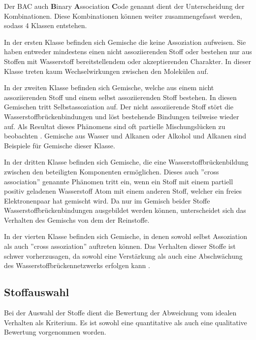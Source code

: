 \documentclass[../thesis.tex]{subfiles}
\begin{document}
Der BAC auch \textbf{B}inary \textbf{A}ssociation \textbf{C}ode genannt dient der Unterscheidung der Kombinationen. Diese Kombinationen können weiter zusammengefasst werden, sodass 4 Klassen entstehen.

In der ersten Klasse befinden sich Gemische die keine Assoziation aufweisen. Sie haben entweder mindestens einen nicht assoziierenden Stoff oder bestehen nur aus Stoffen mit Wasserstoff bereitstellendem oder akzeptierenden Charakter. In dieser Klasse treten kaum Wechselwirkungen zwischen den Molekülen auf.

In der zweiten Klasse befinden sich Gemische, welche aus einem nicht assoziierenden Stoff und einem selbst assoziierenden Stoff bestehen. In diesen Gemischen tritt Selbstassoziation auf. Der nicht assoziierende Stoff stört die Wasserstoffbrückenbindungen und löst bestehende Bindungen teilweise wieder auf. Als Resultat dieses Phänomens sind oft partielle Mischungslücken zu beobachten \cite{jaubert2020benchmark}. Gemische aus Wasser und Alkanen oder Alkohol und Alkanen sind Beispiele für Gemische dieser Klasse.

In der dritten Klasse befinden sich Gemische, die eine Wasserstoffbrückenbildung zwischen den beteiligten Komponenten ermöglichen. Dieses auch ''cross association'' genannte Phänomen tritt ein, wenn ein Stoff mit einem partiell positiv geladenen Wasserstoff Atom mit einem anderen Stoff, welcher ein freies Elektronenpaar hat gemischt wird. Da nur im Gemisch beider Stoffe Wasserstoffbrückenbindungen ausgebildet werden können, unterscheidet sich das Verhalten des Gemischs von dem der Reinstoffe.

In der vierten Klasse befinden sich Gemische, in denen sowohl selbst Assoziation als auch ''cross assoziation'' auftreten können. Das Verhalten dieser Stoffe ist schwer vorherzusagen, da sowohl eine Verstärkung als auch eine Abschwächung des Wasserstoffbrückennetzwerks erfolgen kann \cite{jaubert2020benchmark}.

\subsection{Stoffauswahl}

Bei der Auswahl der Stoffe dient die Bewertung der Abweichung vom idealen Verhalten als Kriterium. Es ist sowohl eine quantitative als auch eine qualitative Bewertung vorgenommen worden.
\end{document}
